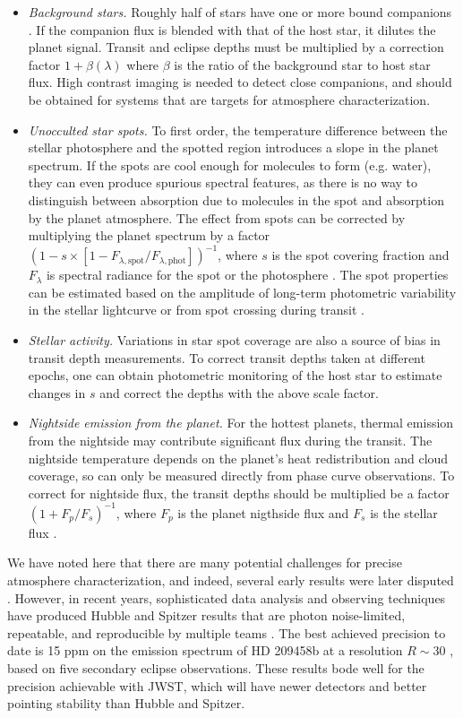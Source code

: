 \documentclass[graybox,natbib,nosecnum]{svmult}
\begin{document}
\begin{itemize}
\item{\emph{Background stars.} Roughly half of stars have one or more bound companions \citep{raghavan10}. If the companion flux is blended with that of the host star, it dilutes the planet signal. Transit and eclipse depths must be multiplied by a correction factor $1 + \beta(\lambda)$ where $\beta$ is the ratio of the background star to host star flux. High contrast imaging is needed to detect close companions, and should be obtained for systems that are targets for atmosphere characterization.}
\item{\emph{Unocculted star spots.} To first order, the temperature difference between the stellar photosphere and the spotted region introduces a slope in the planet spectrum. If the spots are cool enough for molecules to form (e.g. water), they can even produce spurious spectral features, as there is no way to distinguish between absorption due to molecules in the spot and absorption by the planet atmosphere. The effect from spots can be corrected by multiplying the planet spectrum by a factor $(1-s\times[1-F_{\lambda,\mathrm{spot}}/F_{\lambda,\mathrm{phot}}])^{-1}$, where $s$ is the spot covering fraction and $F_\lambda$ is spectral radiance for the spot or the photosphere \citep{mccullough14}. The spot properties can be estimated based on the amplitude of long-term photometric variability in the stellar lightcurve or from spot crossing during transit \citep[e.g.][]{pont08}.} 
\item{\emph{Stellar activity.} Variations in star spot coverage are also a source of bias in transit depth measurements. To correct transit depths taken at different epochs, one can obtain photometric monitoring of the host star to estimate changes in $s$ and correct the depths with the above scale factor.} 
\item{\emph{Nightside emission from the planet.} For the hottest planets, thermal emission from the nightside may contribute significant flux during the transit. The nightside temperature depends on the planet's heat redistribution and cloud coverage, so can only be measured directly from phase curve observations. To correct for nightside flux, the transit depths should be multiplied be a factor $(1 + F_p/F_s)^{-1}$, where $F_p$ is the planet nigthside flux and $F_s$ is the stellar flux \citep{kipping10}.} 
\end{itemize}

We have noted here that there are many potential challenges for precise atmosphere characterization, and indeed, several early results were later disputed \citep[e.g.][]{tinetti07, swain08, gibson11}. However, in recent years, sophisticated data analysis and observing techniques have produced Hubble and Spitzer results that are photon noise-limited, repeatable, and reproducible by multiple teams \citep[e.g.][]{deming13, kreidberg14a, ingalls16}. The best achieved precision to date is 15 ppm on the emission spectrum of HD 209458b at a resolution $R\sim 30$ \citep{line16}, based on five secondary eclipse observations. These results bode well for the precision achievable with JWST, which will have newer detectors and better pointing stability than Hubble and Spitzer.
\end{document}
